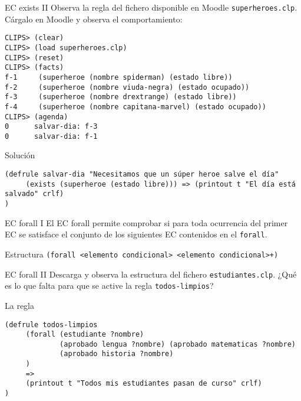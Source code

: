 \documentclass[usenames,dvipsnames,aspectratio=169]{beamer}
\begin{document}
\begin{frame}[fragile]{EC exists II}
	Observa la regla del fichero disponible en Moodle \texttt{superheroes.clp}. Cárgalo en Moodle y observa el comportamiento:
	\begin{minipage}{\textwidth}
		\footnotesize
		\begin{verbatim}
CLIPS> (clear)
CLIPS> (load superheroes.clp)
CLIPS> (reset)
CLIPS> (facts)
f-1     (superheroe (nombre spiderman) (estado libre))
f-2     (superheroe (nombre viuda-negra) (estado ocupado))
f-3     (superheroe (nombre drextrange) (estado libre))
f-4     (superheroe (nombre capitana-marvel) (estado ocupado))
CLIPS> (agenda)
0      salvar-dia: f-3
0      salvar-dia: f-1
		\end{verbatim}
	\end{minipage}
	\begin{exampleblock}{Solución}
		\footnotesize
		\begin{verbatim}
(defrule salvar-dia "Necesitamos que un súper heroe salve el día"
     (exists (superheroe (estado libre))) => (printout t "El día está salvado" crlf)
)
		\end{verbatim}
	\end{exampleblock}
\end{frame}

\begin{frame}{EC forall I}
	El EC forall permite comprobar si para toda ocurrencia del primer EC se satisface el conjunto de los siguientes EC contenidos en el \texttt{forall}.
	\begin{block}{Estructura}
		\texttt{(forall <elemento condicional> <elemento condicional>+)}
	\end{block}
\end{frame}

\begin{frame}[fragile]{EC forall II}
	Descarga y observa la estructura del fichero \texttt{estudiantes.clp}.
	¿Qué es lo que falta para que se active la regla \texttt{todos-limpios}?
	\begin{exampleblock}{La regla}
		\begin{verbatim}
(defrule todos-limpios
     (forall (estudiante ?nombre)
             (aprobado lengua ?nombre) (aprobado matematicas ?nombre)
             (aprobado historia ?nombre)
     )
     =>
     (printout t "Todos mis estudiantes pasan de curso" crlf)
)
		\end{verbatim}
	\end{exampleblock}
\end{frame} 
\end{document}
